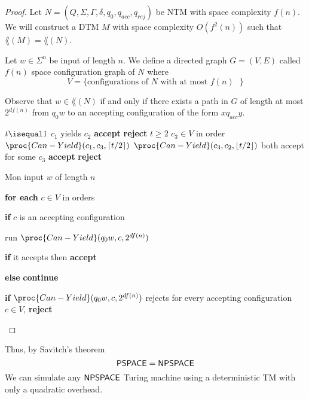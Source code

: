 \begin{proof}
    Let $N = (Q,\Sigma,\Gamma, \delta, q_0, q_{acc}, q_{rej})$ be NTM with space complexity $f(n)$. We will construct a DTM $M$ with space complexity $O(f^2(n))$ such that $\lang(M) = \lang(N)$.

    Let $w \in \Sigma^n$ be input of length $n$. We define a directed graph $G = (V,E)$ called $f(n)$ space configuration graph of $N$ where
    $$
    V = \{\text{configurations of $N$ with at most $f(n)$ }\}
    $$

    Observe that $w \in \lang(N)$ if and only if there exists a path in $G$ of length at most $2^{d f(n)}$ from $q_0w$ to an accepting configuration of the form $xq_{acc}y$.

    \begin{codebox}
        \li \If $t \isequal 1$ \Then
            \li \If $c_1$ yields $c_2$ \Then
                \li \textbf{accept}
            \li \Else \textbf{reject}
            \End
        \End
        \li \If $t \geq 2$ \Then
            \li \For $c_3 \in V$ in order \Do
                \li $\proc{Can-Yield}(c_1,c_3,\lceil t/2 \rceil )$ 
                \li $\proc{Can-Yield}(c_3,c_2,\lfloor t/2 \rfloor )$
                \li \If both accept for some $c_3$ \Then
                    \li \textbf{accept}
                \li \Else \textbf{reject}
    \end{codebox}

\begin{turing}{M}{on input $w$ of length $n$}
    \item \textbf{for each} $c \in V$ in orders
    \item \qquad \textbf{if} $c$ is an accepting configuration
    \item \qquad \qquad run $\proc{Can-Yield}(q_0w, c, 2^{df(n)})$ 
    \item \qquad \qquad \textbf{if} it accepts then \textbf{accept}
    \item \qquad \qquad \textbf{else} \textbf{continue}
    \item \qquad \textbf{if} $\proc{Can-Yield}(q_0w, c, 2^{df(n)})$ rejects for every accepting configuration $c \in V$, \textbf{reject}
\end{turing}

\end{proof}

Thus, by Savitch's theorem
$$
\mathsf{PSPACE} = \mathsf{NPSPACE}
$$
We can simulate any $\mathsf{NPSPACE}$ Turing machine using a deterministic TM with only a quadratic overhead.

